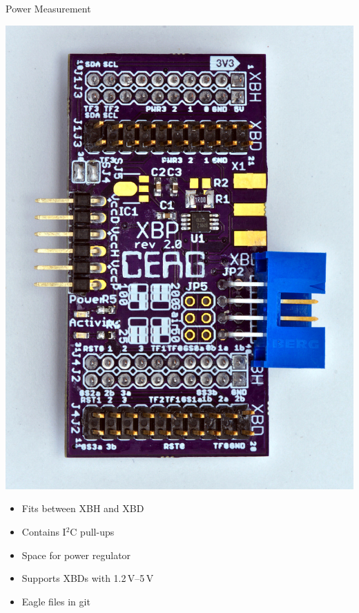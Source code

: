 \documentclass[xcolor=pdftex,dvipsnames,table,final]{beamer}
\begin{document}
\begin{frame}[fragile]{}
\begin{columns}[t, totalwidth=\textwidth]
\begin{column}{.675\linewidth}
\begin{columns}
\begin{column}{.473\linewidth}
       \begin{block}{Power Measurement}
        \begin{minipage}{0.4\linewidth}
		\includegraphics[scale=1.0]{../figures/xbp-full-top90}
        \end{minipage}%
	\begin{minipage}{0.5\linewidth}
          \begin{itemize}
            \item Fits between XBH and XBD
            \item Contains I$^2$C pull-ups
            \item Space for power regulator
            \item Supports XBDs with 1.2\,V--5\,V
            \item Eagle files in git
          \end{itemize}

\end{minipage}
\end{block}
\end{column}
\end{columns}
\end{column}
\end{columns}
\end{frame}
\end{document}
